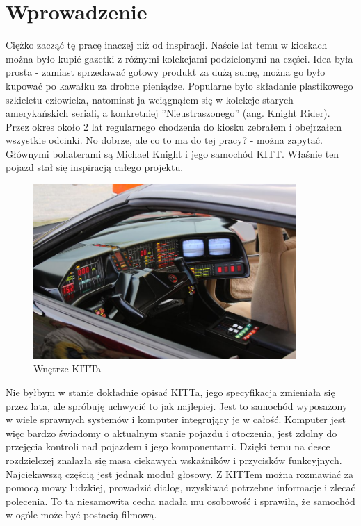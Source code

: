 \documentclass[declaration,shortabstract, inz]{iithesis}
\author         {Michał Postawka}
\begin{document}

\chapter{Wprowadzenie}

Ciężko zacząć tę pracę inaczej niż od inspiracji. Naście lat temu w kioskach można było kupić gazetki z różnymi kolekcjami podzielonymi na części. Idea była prosta - zamiast sprzedawać gotowy produkt za dużą sumę, można go było kupować po kawałku za drobne pieniądze. Popularne było składanie plastikowego szkieletu człowieka, natomiast ja wciągnąłem się w kolekcje starych amerykańskich seriali, a konkretniej  ''Nieustraszonego'' (ang. Knight Rider). Przez okres około 2 lat regularnego chodzenia do kiosku zebrałem i obejrzałem wszystkie odcinki.
No dobrze, ale co to ma do tej pracy? - można zapytać. Głównymi bohaterami są Michael Knight i jego samochód KITT. Właśnie ten pojazd stał się inspiracją całego projektu.

\begin{figure}[htp]
    \centering
    \includegraphics[width=10cm]{images/kitt_interior.jpg}
    \caption{Wnętrze KITTa}
    \label{fig:kitt}
\end{figure}

Nie byłbym w stanie dokładnie opisać KITTa, jego specyfikacja zmieniała się przez lata, ale spróbuję uchwycić to jak najlepiej. Jest to samochód wyposażony w wiele sprawnych systemów i komputer integrujący je w całość. Komputer jest więc bardzo świadomy o aktualnym stanie pojazdu i otoczenia, jest zdolny do przejęcia kontroli nad pojazdem i jego komponentami. Dzięki temu na desce rozdzielczej znalazła się masa ciekawych wskaźników i przycisków funkcyjnych. Najciekawszą częścią jest jednak moduł głosowy. Z KITTem można rozmawiać za pomocą mowy ludzkiej, prowadzić dialog, uzyskiwać potrzebne informacje i zlecać polecenia. To ta niesamowita cecha nadała mu osobowość i sprawiła, że samochód w ogóle może być postacią filmową.
\end{document}
